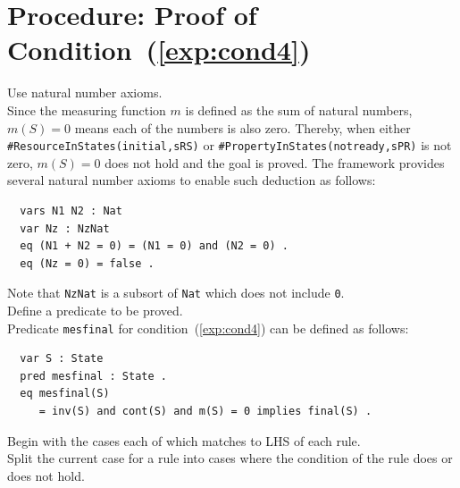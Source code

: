 \documentclass[12pt]{report}
\newcommand{\stt}[1]{{\small{\tt {#1}}}}
\begin{document}
\section{Procedure: Proof of Condition~(\ref{exp:cond4})}
\label{sec:mesfinal}
 Use natural number axioms. \\
Since the measuring function $m$ is defined as the sum of natural
numbers, $m(S) = 0$ means each of the numbers is also zero. Thereby,
when either \stt{\#ResourceInStates(initial,sRS)} or
\stt{\#PropertyInStates(notready,sPR)} is not zero, $m(S) = 0$ does
not hold and the goal is proved. The framework provides
several natural number axioms to enable such deduction as follows:
\small
\begin{verbatim}
  vars N1 N2 : Nat
  var Nz : NzNat
  eq (N1 + N2 = 0) = (N1 = 0) and (N2 = 0) .
  eq (Nz = 0) = false .
\end{verbatim}
\normalsize
Note that {\tt NzNat} is a subsort of {\tt Nat} which does not
include {\tt 0}.\\

 Define a predicate to be proved. \\ Predicate
         {\tt mesfinal} for condition~(\ref{exp:cond4}) can be defined as follows:
\small
\begin{verbatim}
  var S : State
  pred mesfinal : State .
  eq mesfinal(S)
     = inv(S) and cont(S) and m(S) = 0 implies final(S) .
\end{verbatim}
\normalsize

 Begin with the cases each of which matches to
LHS of each rule. \\ 
 Split the current case for a rule into
cases where the condition of the rule does or does not hold. 
\end{document}
